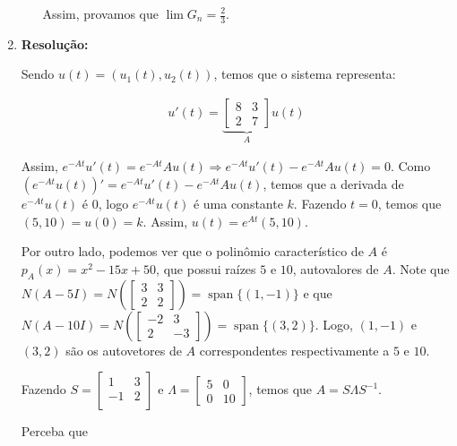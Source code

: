 \documentclass[leqno]{article}
\DeclareMathOperator{\spn}{span}
\begin{document}
\begin{enumerate}
\begin{enumerate}
        Assim, provamos que $\lim G_n = \frac{2}{3}$.
    \end{enumerate}
    
    \item 
    
    \textbf{Resolução:}
    
    Sendo $u(t)=(u_1(t), u_2(t))$, temos que o sistema representa:
    
    \begin{align*}
        u'(t)=\underbrace{\begin{bmatrix}8 & 3\\
        2 & 7\end{bmatrix}}_Au(t)
    \end{align*}
    
    Assim, $e^{-At}u'(t)=e^{-At}Au(t)\Rightarrow e^{-At}u'(t)-e^{-At}Au(t)=0$. Como $(e^{-At}u(t))'=e^{-At}u'(t)-e^{-At}Au(t)$, temos que a derivada de $e^{-At}u(t)$ é $0$, logo $e^{-At}u(t)$ é uma constante $k$. Fazendo $t=0$, temos que $(5,10)=u(0)=k$. Assim, $u(t)=e^{At}(5,10)$.
    
    Por outro lado, podemos ver que o polinômio característico de $A$ é $p_A(x)=x^2-15x+50$, que possui raízes $5$ e $10$, autovalores de $A$. Note que $N(A-5I)=N\left(\begin{bmatrix}
            3 & 3\\
            2 & 2
    \end{bmatrix}\right)=\spn\{(1,-1)\}$ e que $N(A-10I)=N\left(\begin{bmatrix}
            -2 & 3\\
            2 & -3
    \end{bmatrix}\right)=\spn\{(3,2)\}$. Logo, $(1,-1)$ e $(3,2)$ são os autovetores de $A$ correspondentes respectivamente a $5$ e $10$.
    
    Fazendo $S=\begin{bmatrix}
            1 & 3\\
            -1 & 2\\
    \end{bmatrix}$ e $\Lambda=\begin{bmatrix}
            5 & 0\\
            0 & 10
    \end{bmatrix}$, temos que $A=S\Lambda S^{-1}$.
    
    Perceba que
    

\end{enumerate}
\end{document}
